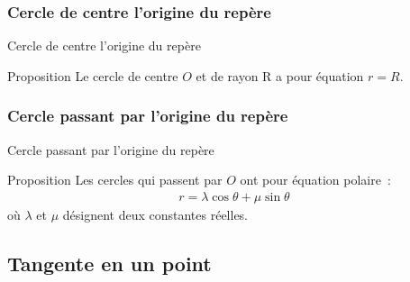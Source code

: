 \documentclass[14pt]{beamer}
\begin{document}
\subsubsection{Cercle de centre l'origine du repère}
\begin{frame}{Cercle de centre l'origine du repère}
        \begin{alertblock}{Proposition}
                Le cercle de centre $O$ et de rayon R a pour équation $r=R$.
        \end{alertblock}
\end{frame}
\subsubsection{Cercle passant par l'origine du repère}
\begin{frame}{Cercle passant par l'origine du repère}
        \begin{alertblock}{Proposition}
                Les cercles qui passent par $O$
                ont pour équation polaire~:
                \begin{align*}
                        r=\lambda\cos\theta+\mu\sin\theta
                \end{align*}
                où $\lambda$ et $\mu$ désignent deux constantes réelles.
        \end{alertblock}
\end{frame}

\subsection{Tangente en un point}
\end{document}
